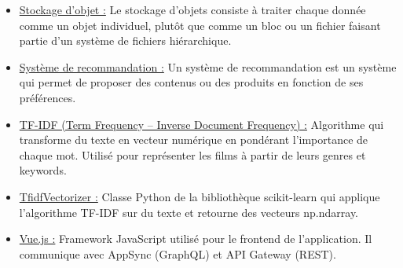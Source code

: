 \documentclass[a4paper,12pt]{report}
\begin{document}
\begin{itemize}
    \item \underline{Stockage d'objet :} Le stockage d'objets consiste à traiter chaque donnée comme un objet individuel, plutôt que comme un bloc ou un fichier faisant partie d'un système de fichiers hiérarchique.
    \item \underline{Système de recommandation :} Un système de recommandation est un système qui permet de proposer des contenus ou des produits en fonction de ses préférences.
    \item \underline{TF-IDF (Term Frequency – Inverse Document Frequency) :} Algorithme qui transforme du texte en vecteur numérique en pondérant l’importance de chaque mot. Utilisé pour représenter les films à partir de leurs genres et keywords.
    \item \underline{TfidfVectorizer :} Classe Python de la bibliothèque scikit-learn qui applique l’algorithme TF-IDF sur du texte et retourne des vecteurs np.ndarray.
    \item \underline{Vue.js :} Framework JavaScript utilisé pour le frontend de l’application. Il communique avec AppSync (GraphQL) et API Gateway (REST).

\end{itemize}
\end{document}
